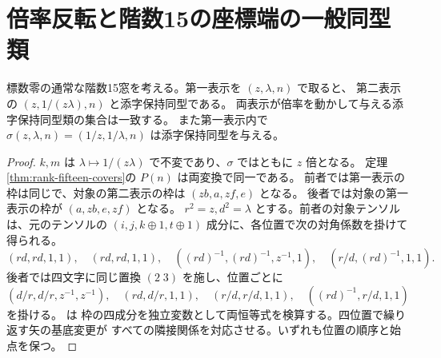 \section{倍率反転と階数15の座標端の一般同型類}
\label{sec:rank-fifteen-endpoint-orbits}
\begin{theorem}\label{thm:rank-fifteen-endpoint-orbits}
標数零の通常な階数15窓を考える。第一表示を $(z,\lambda,n)$ で取ると、
第二表示の $(z,1/(z\lambda),n)$ と添字保持同型である。
両表示が倍率を動かして与える添字保持同型類の集合は一致する。
また第一表示内で $\sigma(z,\lambda,n)=(1/z,1/\lambda,n)$ は添字保持同型を与える。
\end{theorem}
\begin{proof}
$k,m$ は $\lambda\mapsto1/(z\lambda)$ で不変であり、$\sigma$ ではともに $z$ 倍となる。
定理\ref{thm:rank-fifteen-covers}の $P(n)$ は両変換で同一である。
前者では第一表示の枠は同じで、対象の第二表示の枠は $(zb,a,zf,e)$ となる。
後者では対象の第一表示の枠が $(a,zb,e,zf)$ となる。
$r^2=z,d^2=\lambda$ とする。前者の対象テンソルは、元のテンソルの
$(i,j,k\oplus1,t\oplus1)$ 成分に、各位置で次の対角係数を掛けて得られる。
\[
 (rd,rd,1,1),\quad(rd,rd,1,1),\quad
 ((rd)^{-1},(rd)^{-1},z^{-1},1),\quad(r/d,(rd)^{-1},1,1).
\]
後者では四文字に同じ置換 $(2\;3)$ を施し、位置ごとに
\[
 (d/r,d/r,z^{-1},z^{-1}),\quad(rd,d/r,1,1),\quad
 (r/d,r/d,1,1),\quad((rd)^{-1},r/d,1,1)
\]
を掛ける。 は
枠の四成分を独立変数として両恒等式を検算する。四位置で繰り返す矢の基底変更が
すべての隣接関係を対応させる。いずれも位置の順序と始点を保つ。
\end{proof}

